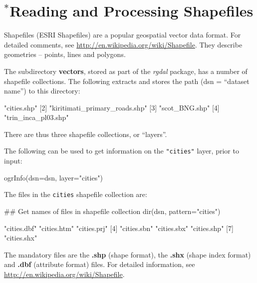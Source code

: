\documentclass{tufte-book}\usepackage[]{graphicx}\usepackage[]{color}
\newcommand{\txtt}[1]{\texttt{#1}}
\begin{document}
{\small
\section{$^*$Reading and Processing Shapefiles}
Shapefiles (ESRI Shapefiles) are a popular geospatial vector data
format.  For detailed comments, see
\url{http://en.wikipedia.org/wiki/Shapefile}.  They describe
geometries -- points, lines and polygons.

The subdirectory {\bf vectors}, stored as part of the {\em rgdal}
package, has a number of shapefile collections.  The following
extracts and stores the path (dsn = ``dataset name'') to this
directory:
\begin{Schunk}
\begin{Soutput}
[1] "cities.shp"                  
[2] "kiritimati_primary_roads.shp"
[3] "scot_BNG.shp"                
[4] "trin_inca_pl03.shp"          
\end{Soutput}
\end{Schunk}
\noindent
There are thus three shapefile collections, or ``layers''.
\begin{marginfigure}
  The following can be used to get information on the \txtt{"cities"}
layer, prior to input:
\begin{Schunk}
\begin{Sinput}
ogrInfo(dsn=dsn,
        layer="cities")
\end{Sinput}
\end{Schunk}
\end{marginfigure}

The files in the \txtt{cities} shapefile collection are:
\begin{Schunk}
\begin{Sinput}
## Get names of files in shapefile collection
dir(dsn, pattern="cities")
\end{Sinput}
\begin{Soutput}
[1] "cities.dbf" "cities.htm" "cities.prj"
[4] "cities.sbn" "cities.sbx" "cities.shp"
[7] "cities.shx"
\end{Soutput}
\end{Schunk}
The mandatory files are the {\bf .shp} (shape format), the {\bf .shx}
(shape index format) and {\bf .dbf} (attribute format) files.  For
  detailed information, see
  \url{http://en.wikipedia.org/wiki/Shapefile}.

}
\end{document}
